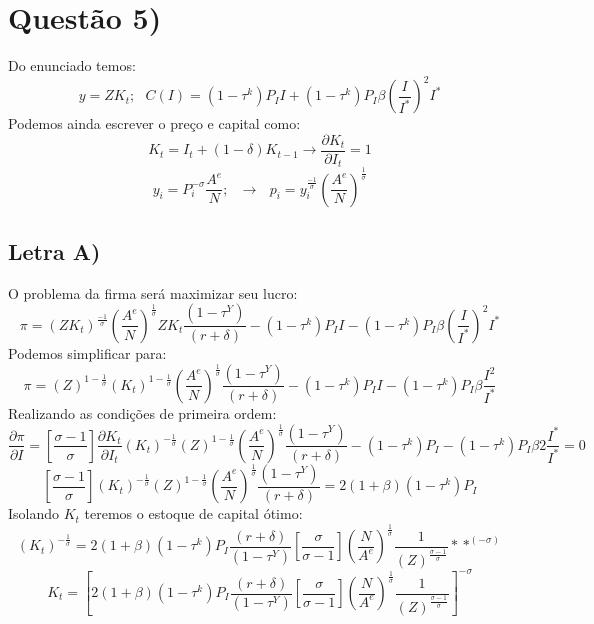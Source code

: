\documentclass{article}
\begin{document}
\section*{Questão 5)}
Do enunciado temos:
$$y=ZK_t; \>\>\> C(I) = (1-\tau^k)P_I I+(1-\tau^k)P_I\beta\left(\frac{I}{I^*}\right)^2I^*$$
Podemos ainda escrever o preço e capital como:
$$K_t=I_t +(1-\delta)K_{t-1} \to \frac{\partial K_t}{\partial I_t}=1$$
$$y_i=P_i^{-\sigma}\frac{A^{e}}{N}; \>\>\> \to  \>\>\> p_i=y_i^{\frac{-1}{\sigma}}\left(\frac{A^{e}}{N}\right)^\frac{1}{\sigma}$$
\subsection*{Letra A)}
O problema da firma será maximizar seu lucro:
\begin{equation}
    \pi = (ZK_t)^{\frac{-1}{\sigma}}\left(\frac{A^{e}}{N}\right)^\frac{1}{\sigma}
    ZK_t \frac{(1-\tau^Y)}{(r+\delta)} - (1-\tau^k)P_I I-(1-\tau^k)P_I\beta\left(\frac{I}{I^*}\right)^2I^*
\end{equation}
Podemos simplificar para:
\begin{equation}
    \pi = (Z)^{1-\frac{1}{\sigma}}(K_t)^{1-\frac{1}{\sigma}}\left(\frac{A^{e}}{N}\right)^\frac{1}{\sigma}\frac{(1-\tau^Y)}{(r+\delta)} - (1-\tau^k)P_I I-(1-\tau^k)P_I\beta\frac{I^2}{I^*}
\end{equation}
Realizando as condições de primeira ordem:
\begin{equation}
    \frac{\partial \pi}{\partial I} = \left[\frac{\sigma-1}{\sigma}\right] \frac{\partial K_t}{\partial I_t}\left(K_t\right)^{-\frac{1}{\sigma}}(Z)^{1-\frac{1}{\sigma}}\left(\frac{A^{e}}{N}\right)^\frac{1}{\sigma}\frac{(1-\tau^Y)}{(r+\delta)} - (1-\tau^k)P_I-(1-\tau^k)P_I\beta 2\frac{I^*}{I^*}=0
\end{equation}
\begin{equation}
    \left[\frac{\sigma-1}{\sigma}\right] (K_t)^{-\frac{1}{\sigma}}(Z)^{1-\frac{1}{\sigma}}\left(\frac{A^{e}}{N}\right)^\frac{1}{\sigma}\frac{(1-\tau^Y)}{(r+\delta)} = 2(1+\beta)(1-\tau^k)P_I
\end{equation}
Isolando $K_t$ teremos o estoque de capital ótimo:
\begin{equation}
    (K_t)^{-\frac{1}{\sigma}} = 2(1+\beta)(1-\tau^k)P_I\frac{(r+\delta)}{(1-\tau^Y)}\left[\frac{\sigma}{\sigma-1}\right]\left(\frac{N}{A^{e}}\right)^\frac{1}{\sigma}\frac{1}{(Z)^{\frac{\sigma-1}{\sigma}}} **^{(-\sigma)}
\end{equation}
\begin{equation}
    K_t = \left[2(1+\beta)(1-\tau^k)P_I\frac{(r+\delta)}{(1-\tau^Y)}\left[\frac{\sigma}{\sigma-1}\right]\left(\frac{N}{A^{e}}\right)^\frac{1}{\sigma}\frac{1}{(Z)^{\frac{\sigma-1}{\sigma}}}\right]^{-\sigma}
\end{equation}
\end{document}
